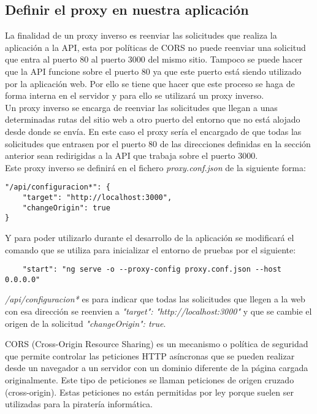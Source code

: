 \subsection{Definir el proxy en nuestra aplicación}
La finalidad de un proxy inverso es reenviar las solicitudes que realiza la aplicación a la API, esta por políticas de CORS no puede reenviar una solicitud que entra al puerto 80 al puerto 3000 del mismo sitio. Tampoco se puede hacer que la API funcione sobre el puerto 80 ya que este puerto está siendo utilizado por la aplicación web. Por ello se tiene que hacer que este proceso se haga de forma interna en el servidor y para ello se utilizará un proxy inverso.
\\Un proxy inverso se encarga de reenviar las solicitudes que llegan a unas determinadas rutas del sitio web a otro puerto del entorno que no está alojado desde donde se envía. En este caso el proxy sería el encargado de que todas las solicitudes que entrasen por el puerto 80 de las direcciones definidas en la sección anterior sean redirigidas a la API que trabaja sobre el puerto 3000.
\\Este proxy inverso se definirá en el fichero \textit{proxy.conf.json} de la siguiente forma:
\begin{verbatim}
"/api/configuracion*": {
    "target": "http://localhost:3000",
    "changeOrigin": true
}
\end{verbatim}
Y para poder utilizarlo durante el desarrollo de la aplicación se modificará el comando que se utiliza para inicializar el entorno de pruebas por el siguiente:
\begin{verbatim}
    "start": "ng serve -o --proxy-config proxy.conf.json --host 0.0.0.0"
\end{verbatim}
\textit{/api/configuracion*} es para indicar que todas las solicitudes que llegen a la web con esa dirección se reenvien a \textit{"target": "http://localhost:3000"} y que se cambie el origen de la solicitud \textit{"changeOrigin": true}.
\begin{tcolorbox}
    [colback=green!5!white,colframe=green!75!black,fonttitle=\bfseries,title=¿Qué son las políticas de CORS?]
    CORS (Cross-Origin Resource Sharing) es un mecanismo o política de seguridad que permite controlar las peticiones HTTP asíncronas que se pueden realizar desde un navegador a un servidor con un dominio diferente de la página cargada originalmente. Este tipo de peticiones se llaman peticiones de origen cruzado (cross-origin). Estas peticiones no están permitidas por ley porque suelen ser utilizadas para la piratería informática.
\end{tcolorbox}